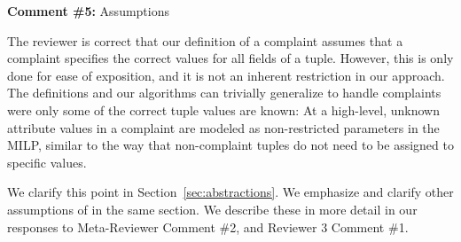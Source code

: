\comskip

\noindent
\textbf{Comment \#5:} Assumptions
\begin{quote}
\end{quote}

The reviewer is correct that our definition of a complaint assumes that a complaint
specifies the correct values for all fields of a tuple. However, this is only done for
ease of exposition, and it is not an inherent restriction in our approach. The
definitions and our algorithms can trivially generalize to handle complaints
were only some of the correct tuple values are known: At a high-level, unknown
attribute values in a complaint are modeled as non-restricted parameters in
the MILP, similar to the way that non-complaint tuples do not need to be
assigned to specific values.

We clarify this point in Section~\ref{sec:abstractions}. We emphasize and
clarify other assumptions of \sys in the same section. We describe these in
more detail in our responses to Meta-Reviewer Comment \#2, and Reviewer 3
Comment \#1.

% 
% 



\comskip